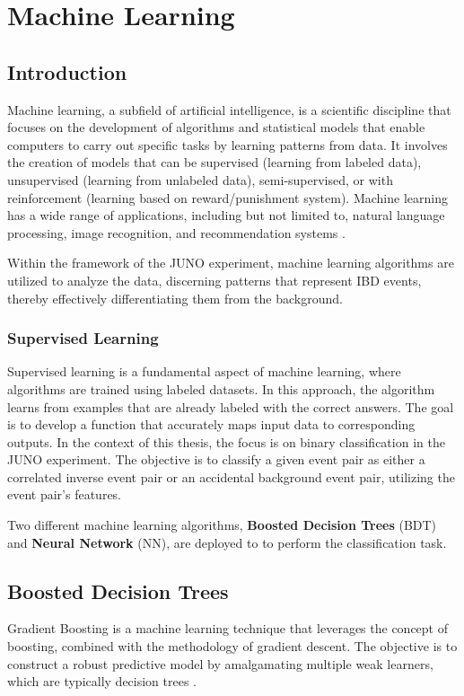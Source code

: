 \chapter{Machine Learning}
\section{Introduction}

Machine learning, a subfield of artificial intelligence, is a scientific discipline that focuses on the development of algorithms and statistical models that enable computers to carry out specific tasks by learning patterns from data. It involves the creation of models that can be supervised (learning from labeled data), unsupervised (learning from unlabeled data), semi-supervised, or with reinforcement (learning based on reward/punishment system). Machine learning has a wide range of applications, including but not limited to, natural language processing, image recognition, and recommendation systems \cite{mitchell1997machine}.

Within the framework of the JUNO experiment, machine learning algorithms are utilized to analyze the data, discerning patterns that represent IBD events, thereby effectively differentiating them from the background.

\subsection{Supervised Learning}
Supervised learning is a fundamental aspect of machine learning, where algorithms are trained using labeled datasets. In this approach, the algorithm learns from examples that are already labeled with the correct answers. The goal is to develop a function that accurately maps input data to corresponding outputs.
In the context of this thesis, the focus is on binary classification in the JUNO experiment. The objective is to classify a given event pair as either a correlated inverse event pair or an accidental background event pair, utilizing the event pair's features.

Two different machine learning algorithms, \textbf{Boosted Decision Trees} (BDT) and \textbf{Neural Network} (NN), are deployed to  to perform the classification task.

\section{Boosted Decision Trees}

Gradient Boosting is a machine learning technique that leverages the concept of boosting, combined with the methodology of gradient descent. The objective is to construct a robust predictive model by amalgamating multiple weak learners, which are typically decision trees \cite{gb_1}.

